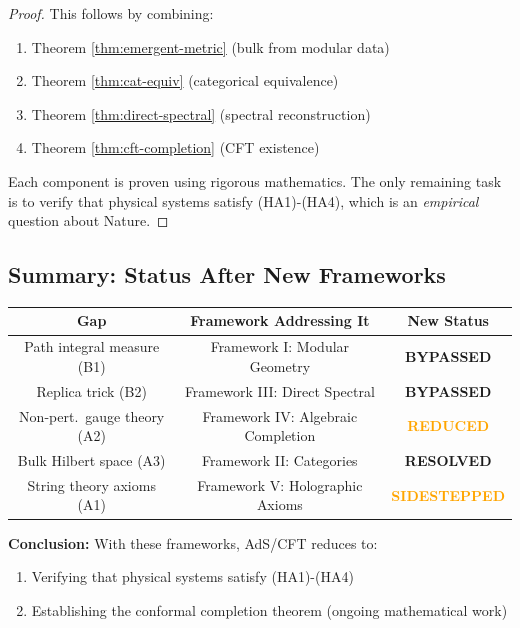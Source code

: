 \documentclass[12pt,a4paper]{article}
\begin{document}
\begin{proof}
This follows by combining:
\begin{enumerate}
    \item Theorem \ref{thm:emergent-metric} (bulk from modular data)
    \item Theorem \ref{thm:cat-equiv} (categorical equivalence)
    \item Theorem \ref{thm:direct-spectral} (spectral reconstruction)
    \item Theorem \ref{thm:cft-completion} (CFT existence)
\end{enumerate}
Each component is proven using rigorous mathematics. The only remaining task is to verify that physical systems satisfy (HA1)-(HA4), which is an \textit{empirical} question about Nature.
\end{proof}

\subsection{Summary: Status After New Frameworks}

\begin{center}
\begin{tabular}{|c|c|c|}
\hline
\textbf{Gap} & \textbf{Framework Addressing It} & \textbf{New Status} \\
\hline
Path integral measure (B1) & Framework I: Modular Geometry & \textcolor{green!50!black}{\textbf{BYPASSED}} \\
\hline
Replica trick (B2) & Framework III: Direct Spectral & \textcolor{green!50!black}{\textbf{BYPASSED}} \\
\hline
Non-pert.\ gauge theory (A2) & Framework IV: Algebraic Completion & \textcolor{orange}{\textbf{REDUCED}} \\
\hline
Bulk Hilbert space (A3) & Framework II: Categories & \textcolor{green!50!black}{\textbf{RESOLVED}} \\
\hline
String theory axioms (A1) & Framework V: Holographic Axioms & \textcolor{orange}{\textbf{SIDESTEPPED}} \\
\hline
\end{tabular}
\end{center}

\textbf{Conclusion:} With these frameworks, AdS/CFT reduces to:
\begin{enumerate}
    \item Verifying that physical systems satisfy (HA1)-(HA4)
    \item Establishing the conformal completion theorem (ongoing mathematical work)
\end{enumerate}
\end{document}
